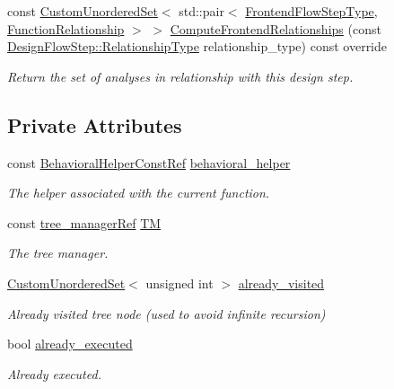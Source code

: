 \begin{DoxyCompactItemize}
const \hyperlink{classCustomUnorderedSet}{Custom\+Unordered\+Set}$<$ std\+::pair$<$ \hyperlink{frontend__flow__step_8hpp_afeb3716c693d2b2e4ed3e6d04c3b63bb}{Frontend\+Flow\+Step\+Type}, \hyperlink{classFrontendFlowStep_af7cf30f2023e5b99e637dc2058289ab0}{Function\+Relationship} $>$ $>$ \hyperlink{classCheckSystemType_a0b50a94579fcc308bbf1177fe2827cc5}{Compute\+Frontend\+Relationships} (const \hyperlink{classDesignFlowStep_a723a3baf19ff2ceb77bc13e099d0b1b7}{Design\+Flow\+Step\+::\+Relationship\+Type} relationship\+\_\+type) const override
\begin{DoxyCompactList}\small\item\em Return the set of analyses in relationship with this design step. \end{DoxyCompactList}\end{DoxyCompactItemize}
\subsection*{Private Attributes}
\begin{DoxyCompactItemize}
\item 
const \hyperlink{behavioral__helper_8hpp_aae973b54cac87eef3b27442aa3e1e425}{Behavioral\+Helper\+Const\+Ref} \hyperlink{classCheckSystemType_a28f0bdd5b247bb4f7b173e18dc44e1da}{behavioral\+\_\+helper}
\begin{DoxyCompactList}\small\item\em The helper associated with the current function. \end{DoxyCompactList}\item 
const \hyperlink{tree__manager_8hpp_a96ff150c071ce11a9a7a1e40590f205e}{tree\+\_\+manager\+Ref} \hyperlink{classCheckSystemType_ad55a0baa8f72589feb542a61c64d6a42}{TM}
\begin{DoxyCompactList}\small\item\em The tree manager. \end{DoxyCompactList}\item 
\hyperlink{classCustomUnorderedSet}{Custom\+Unordered\+Set}$<$ unsigned int $>$ \hyperlink{classCheckSystemType_a4d19149dc31efdcd6f339aa958602ef5}{already\+\_\+visited}
\begin{DoxyCompactList}\small\item\em Already visited tree node (used to avoid infinite recursion) \end{DoxyCompactList}\item 
bool \hyperlink{classCheckSystemType_afbe5cfb1333e1a3d055503cbb35f8722}{already\+\_\+executed}
\begin{DoxyCompactList}\small\item\em Already executed. \end{DoxyCompactList}\end{DoxyCompactItemize}
